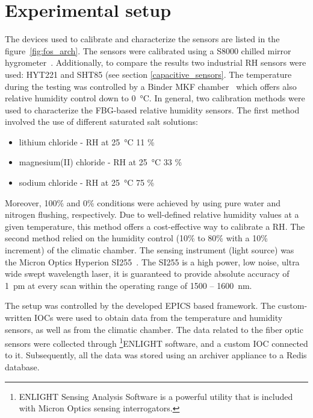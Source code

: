 \section{Experimental setup}
The devices used to calibrate and characterize the sensors are listed in the figure~\ref{fig:fos_arch}. The sensors were calibrated using a S8000 chilled mirror hygrometer~\cite{michell_s8000}. Additionally, to compare the results two industrial \gls{RH} sensors were used: HYT221 and SHT85 (see section \ref{capacitive_sensors}. The temperature during the testing was controlled by a Binder MKF chamber~\cite{binder} which offers also relative humidity control down to \SI{0}{\celsius}. 
In general, two calibration methods were used to characterize the \gls{FBG}-based relative humidity sensors. The first method involved the use of different saturated salt solutions:
\begin{itemize}
    \item lithium chloride - \gls{RH} at \SI{25}{\celsius} 11 \%
    \item magnesium(II) chloride - \gls{RH} at \SI{25}{\celsius} 33 \%
    \item sodium chloride - \gls{RH} at \SI{25}{\celsius} 75 \%
\end{itemize}
Moreover, 100\% and 0\% conditions were achieved by using pure water and nitrogen flushing, respectively. Due to well-defined relative humidity values at a given temperature, this method offers a cost-effective way to calibrate a \gls{RH}. The second method relied on the humidity control (10\% to 80\% with a 10\% increment) of the climatic chamber.  The sensing instrument (light source) was the Micron Optics Hyperion SI255~\cite{si255}. The SI255 is a high power, low noise, ultra wide swept wavelength laser, it is guaranteed to provide absolute accuracy of 1~pm at every scan within the operating range of 1500 -- 1600~nm. 

The setup was controlled by the developed \gls{EPICS} based framework. The custom-written \glspl{IOC} were used to obtain data from the temperature and humidity sensors, as well as from the climatic chamber. The data related to the fiber optic sensors were collected through \footnote{ENLIGHT Sensing Analysis Software is a powerful utility that is included with Micron
Optics sensing interrogators.}{ENLIGHT} software, and a custom \gls{IOC} connected to it. Subsequently, all the data was stored using an archiver appliance to a Redis database. 

